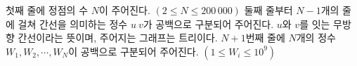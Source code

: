 첫째 줄에 정점의 수 $N$이 주어진다. $(2\leq N\leq 200\,000)$
둘째 줄부터 $N-1$개의 줄에 걸쳐 간선을 의미하는 정수 $u\ v$가 공백으로 구분되어 주어진다. $u$와 $v$를 잇는 무방향 간선이라는 뜻이며, 주어지는 그래프는 트리이다.
$N+1$번째 줄에 $N$개의 정수 $W_1, W_2, \cdots, W_N$이 공백으로 구분되어 주어진다. $(1\leq W_i \leq 10^9)$